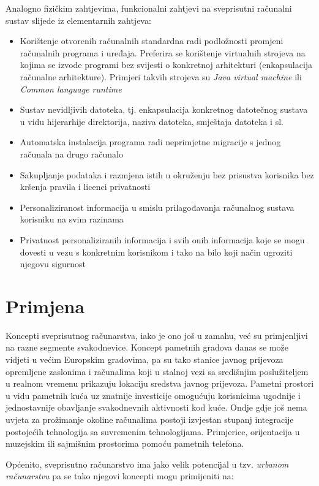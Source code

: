 \documentclass[times, utf8, diplomski, numeric]{fer}
\begin{document}
Analogno fizičkim zahtjevima, funkcionalni zahtjevi na sveprisutni računalni
sustav slijede iz elementarnih zahtjeva:
\begin{itemize}
  \item Korištenje otvorenih računalnih standardna radi podložnosti promjeni
  računalnih programa i uređaja. Preferira se korištenje virtualnih strojeva na
  kojima se izvode programi bez svijesti o konkretnoj arhitekturi
  (enkapsulacija računalne arhitekture). Primjeri takvih strojeva su \emph{Java
  virtual machine} ili \emph{Common language runtime}
  \item Sustav nevidljivih datoteka, tj. enkapsulacija konkretnog datotečnog
  sustava u vidu hijerarhije direktorija, naziva datoteka, smještaja datoteka i
  sl.
  \item Automatska instalacija programa radi neprimjetne migracije s jednog
  računala na drugo računalo
  \item Sakupljanje podataka i razmjena istih u okruženju bez prisustva
  korisnika bez kršenja pravila i licenci privatnosti
  \item Personaliziranost informacija u smislu prilagođavanja računalnog sustava
  korisniku na svim razinama
  \item Privatnost personaliziranih informacija i svih onih informacija koje se
  mogu dovesti u vezu s konkretnim korisnikom i tako na bilo koji način ugroziti
  njegovu sigurnost
\end{itemize}

\section{Primjena}

Koncepti sveprisutnog računarstva, iako je ono još u zamahu, već su primjenljivi
na razne segmente svakodnevice. Koncept pametnih gradova danas se može vidjeti
u većim Europskim gradovima, pa su tako stanice javnog prijevoza opremljene
zaslonima i računalima koji u stalnoj vezi sa središnjim poslužiteljem u realnom
vremenu prikazuju lokaciju sredstva javnog prijevoza. Pametni prostori u vidu
pametnih kuća uz znatnije investicije omogućuju korisnicima ugodnije i
jednostavnije obavljanje svakodnevnih aktivnosti kod kuće. Ondje gdje još
nema uvjeta za prožimanje okoline računalima postoji izvjestan stupanj
integracije postojećih tehnologija sa suvremenim tehnologijama. Primjerice,
orijentacija u muzejskim ili sajmišnim prostorima pomoću pametnih telefona.

Općenito, sveprisutno računarstvo ima jako velik potencijal u tzv.
\emph{urbanom računarstvu} pa se tako njegovi koncepti mogu primijeniti na:
\end{document}
